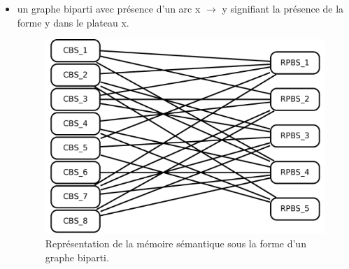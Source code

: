 \begin{itemize}
\item un graphe biparti avec présence d'un arc x $\rightarrow$ y signifiant la présence de la forme y dans le plateau x.
\begin{figure}[H]
\includegraphics[width=\textwidth]{files/memoire/context_graph}
\caption{Représentation de la mémoire sémantique sous la forme d'un graphe biparti.}
\end{figure}
\end{itemize}